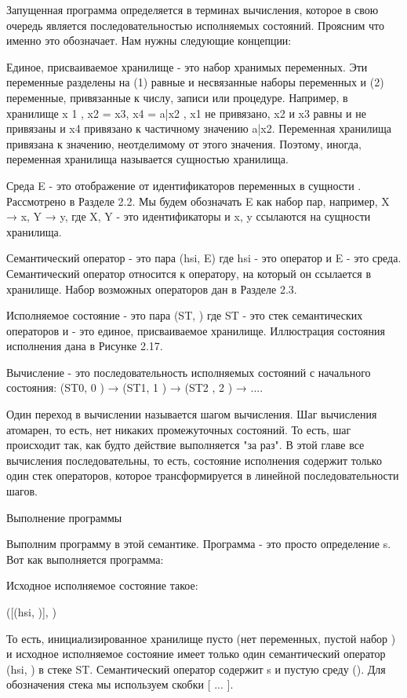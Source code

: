 Запущенная программа определяется в терминах вычисления, которое в свою очередь является последовательностью исполняемых состояний. Проясним что именно это обозначает. Нам нужны следующие концепции:

Единое, присваиваемое хранилище  - это набор хранимых переменных. Эти переменные разделены на (1) равные и несвязанные наборы переменных и (2) переменные, привязанные к числу, записи или процедуре. Например, в хранилище {x 1 , x2 = x3, x4 = a|x2 }, x1 не привязано, x2 и x3 равны и не привязаны и x4 привязано к частичному значению a|x2. Переменная хранилища привязана к значению, неотделимому от этого значения. Поэтому, иногда, переменная хранилища называется сущностью хранилища.

Среда E - это отображение от идентификаторов переменных в сущности . Рассмотрено в Разделе 2.2. Мы будем обозначать E как набор пар, например, {X → x, Y → y}, где X, Y - это идентификаторы и x, y ссылаются на сущности хранилища.

Семантический оператор - это пара (hsi, E) где hsi - это оператор и E - это среда. Семантический оператор относится к оператору, на который он ссылается в хранилище. Набор возможных операторов дан в Разделе 2.3.

Исполняемое состояние - это пара (ST, ) где ST - это стек семантических операторов и  - это единое, присваиваемое хранилище. Иллюстрация состояния исполнения дана в Рисунке 2.17.

Вычисление - это последовательность исполняемых состояний с начального состояния: (ST0, 0 ) → (ST1, 1 ) → (ST2 , 2 ) → ....

Один переход в вычислении называется шагом вычисления. Шаг вычисления атомарен, то есть, нет никаких промежуточных состояний. То есть, шаг происходит так, как будто действие выполняется "за раз". В этой главе все вычисления последовательны, то есть, состояние исполнения содержит только один стек операторов, которое трансформируется в линейной последовательности шагов.

Выполнение программы

Выполним программу в этой семантике. Программа - это просто определение s. Вот как выполняется программа:

Исходное исполняемое состояние такое:

([(hsi, )], )

То есть, инициализированное хранилище пусто (нет переменных, пустой набор ) и исходное исполняемое состояние имеет только один семантический оператор (hsi, ) в стеке ST. Семантический оператор содержит s и пустую среду (). Для обозначения стека мы используем скобки [ ... ].

